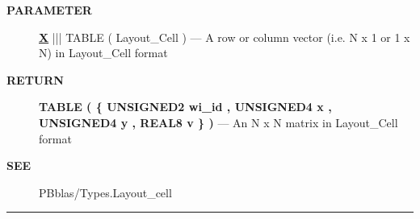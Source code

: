 \par
\begin{description}
\item [\colorbox{tagtype}{\color{white} \textbf{\textsf{PARAMETER}}}] \textbf{\underline{X}} ||| TABLE ( Layout\_Cell ) --- A row or column vector (i.e. N x 1 or 1 x N) in Layout\_Cell format
\end{description}







\par
\begin{description}
\item [\colorbox{tagtype}{\color{white} \textbf{\textsf{RETURN}}}] \textbf{TABLE ( \{ UNSIGNED2 wi\_id , UNSIGNED4 x , UNSIGNED4 y , REAL8 v \} )} --- An N x N matrix in Layout\_Cell format
\end{description}







\par
\begin{description}
\item [\colorbox{tagtype}{\color{white} \textbf{\textsf{SEE}}}] PBblas/Types.Layout\_cell
\end{description}



\rule{\linewidth}{0.5pt}
